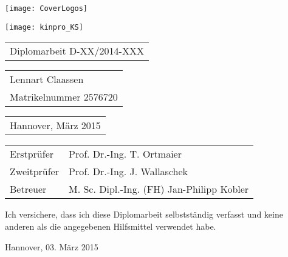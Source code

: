 \begin{titlepage}
\begin{spacing}{2}

\begin{flushright} %
	\vspace*{-20mm}
	\texttt{[image: CoverLogos]}
\end{flushright} %

\vspace{38mm} {

\vfill
\texttt{[image: kinpro\_KS]}

\vfill }
\end{spacing}
\begin{spacing}{1}
\begin{tabular}{l}
 \Large{Diplomarbeit D-XX/2014-XXX}
\end{tabular}

\vspace{5mm}

\begin{tabular}{l}
\large{Lennart Claassen}\\
\large{Matrikelnummer 2576720}
\end{tabular}

\vspace{5mm}

\begin{tabular}{l}
\large{Hannover, März 2015}
\end{tabular}


\vspace{5mm}
{\large
\begin{tabular}{l l}
Erstprüfer  & Prof. Dr.-Ing. T. Ortmaier\\
Zweitprüfer & Prof. Dr.-Ing. J. Wallaschek\\
Betreuer    & M. Sc. Dipl.-Ing. (FH) Jan-Philipp Kobler\\
\end{tabular}
}

\end{spacing}
\end{titlepage}




%
%
%


\noindent Ich versichere, dass ich diese Diplomarbeit selbstständig
verfasst und keine anderen als die angegebenen Hilfsmittel verwendet
habe.

\vspace{25mm}

\noindent Hannover, 03. März 2015
\newpage
